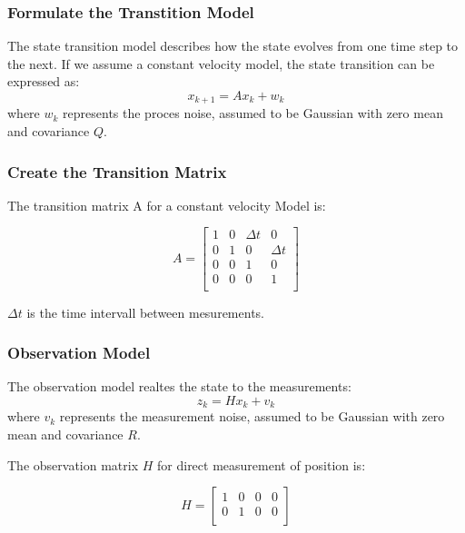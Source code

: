 \documentclass{beamer}
\begin{document}
\begin{frame}
    \frametitle{Formulate the Transtition Model}
    The state transition model describes how the state evolves from one time step to the next.
    If we assume a constant velocity model, the state transition can be expressed as:
    \begin{equation*}
        x_{k+1}=Ax_{k}+w_{k}
    \end{equation*}
    where \(w_{k}\) represents the proces noise, assumed to be Gaussian with zero mean and covariance \(Q\).
\end{frame}

\begin{frame}
    \frametitle{Create the Transition Matrix}
    The transition matrix A for a constant velocity Model is:

    \begin{equation*}
        A = \begin{bmatrix}
            1 & 0 & \Delta t & 0        \\
            0 & 1 & 0        & \Delta t \\
            0 & 0 & 1        & 0        \\
            0 & 0 & 0        & 1        \\
        \end{bmatrix}
    \end{equation*}

    \(\Delta t\) is the time intervall between mesurements.
\end{frame}

\begin{frame}
    \frametitle{Observation Model}
    The observation model realtes the state to the measurements:
    \begin{equation*}
        z_{k}=Hx_{k}+v_{k}
    \end{equation*}
    where \(v_{k}\) represents the measurement noise, assumed to be Gaussian with zero mean and
    covariance \(R\).

    The observation matrix \(H\) for direct measurement of position is:

    \begin{equation*}
        H = \begin{bmatrix}
            1 & 0 & 0 & 0 \\
            0 & 1 & 0 & 0 \\
        \end{bmatrix}
    \end{equation*}

\end{frame}
\end{document}

